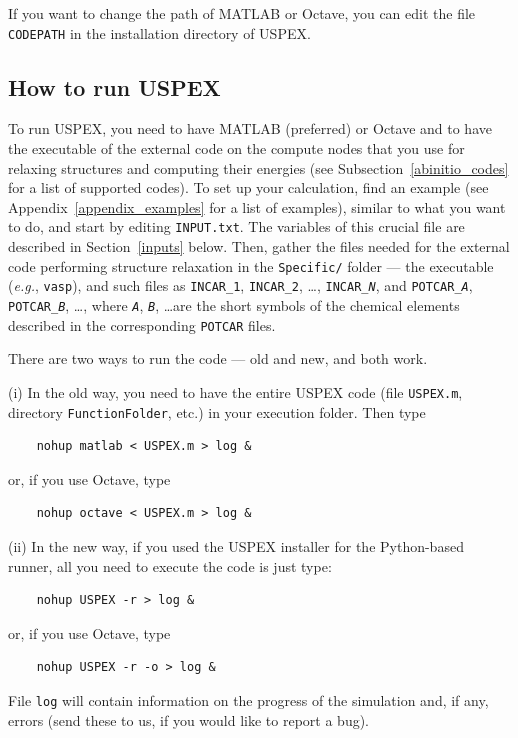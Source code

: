 \documentclass[12pt]{article}
\newcommand{\file}[1]{\texttt{#1}}
\begin{document}
If you want to change the path of MATLAB or Octave, you can edit the file
\file{CODEPATH} in the installation directory of USPEX.

\subsection{How to run USPEX}
To run USPEX, you need to have MATLAB (preferred) or Octave and to have the
executable of the external code on the compute nodes that you use for relaxing
structures and computing their energies (see Subsection~\ref{abinitio_codes} for
a list of supported codes). To set up your calculation, find an example (see
Appendix~\ref{appendix_examples} for a list of examples), similar to what you
want to do, and start by editing \file{INPUT.txt}. The variables of this crucial
file are described in Section~\ref{inputs} below. Then, gather the files needed
for the external code performing structure relaxation in the \file{Specific/}
folder --- the executable (\emph{e.g.}, \file{vasp}), and such files as
\file{INCAR\_1}, \file{INCAR\_2}, \ldots, \file{INCAR\_\emph{N}}, and
\file{POTCAR\_\emph{A}}, \file{POTCAR\_\emph{B}}, \ldots, where
\texttt{\emph{A}}, \texttt{\emph{B}}, \ldots are the short symbols of the
chemical elements described in the corresponding \file{POTCAR} files.

There are two ways to run the code --- old and new, and both work.

(i) In the old way, you need to have the entire USPEX code (file \file{USPEX.m},
directory \file{FunctionFolder}, etc.) in your execution folder. Then type
\begin{verbatim}
    nohup matlab < USPEX.m > log &
\end{verbatim}

or, if you use Octave, type
\begin{verbatim}
    nohup octave < USPEX.m > log &
\end{verbatim}

(ii) In the new way, if you used the USPEX installer for the Python-based
runner, all you need to execute the code is just type:
\begin{verbatim}
    nohup USPEX -r > log &
\end{verbatim}

or, if you use Octave, type
\begin{verbatim}
    nohup USPEX -r -o > log &
\end{verbatim}

File \file{log} will contain information on the progress of the simulation and,
if any, errors (send these to us, if you would like to report a bug).
\end{document}
